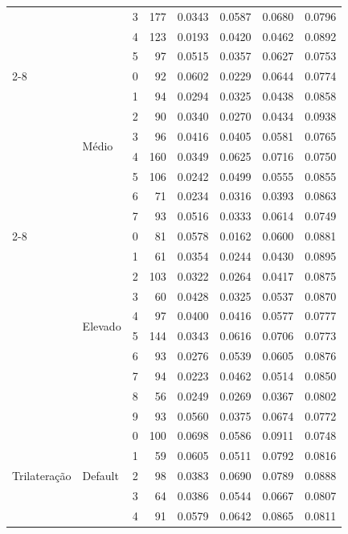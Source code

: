 \begin{table}[htbp]
\begin{tabular}{llrrrrrr}
     &  & 3 & 177 & 0.0343 & 0.0587 & 0.0680 & 0.0796 \\
     &  & 4 & 123 & 0.0193 & 0.0420 & 0.0462 & 0.0892 \\
     &  & 5 & 97 & 0.0515 & 0.0357 & 0.0627 & 0.0753 \\
    \cmidrule(lr){2-8}
     & \multirow{8}{*}{M\'edio} & 0 & 92 & 0.0602 & 0.0229 & 0.0644 & 0.0774 \\
     &  & 1 & 94 & 0.0294 & 0.0325 & 0.0438 & 0.0858 \\
     &  & 2 & 90 & 0.0340 & 0.0270 & 0.0434 & 0.0938 \\
     &  & 3 & 96 & 0.0416 & 0.0405 & 0.0581 & 0.0765 \\
     &  & 4 & 160 & 0.0349 & 0.0625 & 0.0716 & 0.0750 \\
     &  & 5 & 106 & 0.0242 & 0.0499 & 0.0555 & 0.0855 \\
     &  & 6 & 71 & 0.0234 & 0.0316 & 0.0393 & 0.0863 \\
     &  & 7 & 93 & 0.0516 & 0.0333 & 0.0614 & 0.0749 \\
    \cmidrule(lr){2-8}
     & \multirow{10}{*}{Elevado} & 0 & 81 & 0.0578 & 0.0162 & 0.0600 & 0.0881 \\
     &  & 1 & 61 & 0.0354 & 0.0244 & 0.0430 & 0.0895 \\
     &  & 2 & 103 & 0.0322 & 0.0264 & 0.0417 & 0.0875 \\
     &  & 3 & 60 & 0.0428 & 0.0325 & 0.0537 & 0.0870 \\
     &  & 4 & 97 & 0.0400 & 0.0416 & 0.0577 & 0.0777 \\
     &  & 5 & 144 & 0.0343 & 0.0616 & 0.0706 & 0.0773 \\
     &  & 6 & 93 & 0.0276 & 0.0539 & 0.0605 & 0.0876 \\
     &  & 7 & 94 & 0.0223 & 0.0462 & 0.0514 & 0.0850 \\
     &  & 8 & 56 & 0.0249 & 0.0269 & 0.0367 & 0.0802 \\
     &  & 9 & 93 & 0.0560 & 0.0375 & 0.0674 & 0.0772 \\
    \midrule
    \multirow{34}{*}{Trilatera\c{c}\~ao} & \multirow{10}{*}{Default} & 0 & 100 & 0.0698 & 0.0586 & 0.0911 & 0.0748 \\
     &  & 1 & 59 & 0.0605 & 0.0511 & 0.0792 & 0.0816 \\
     &  & 2 & 98 & 0.0383 & 0.0690 & 0.0789 & 0.0888 \\
     &  & 3 & 64 & 0.0386 & 0.0544 & 0.0667 & 0.0807 \\
     &  & 4 & 91 & 0.0579 & 0.0642 & 0.0865 & 0.0811 \\

\end{tabular}
\end{table}
